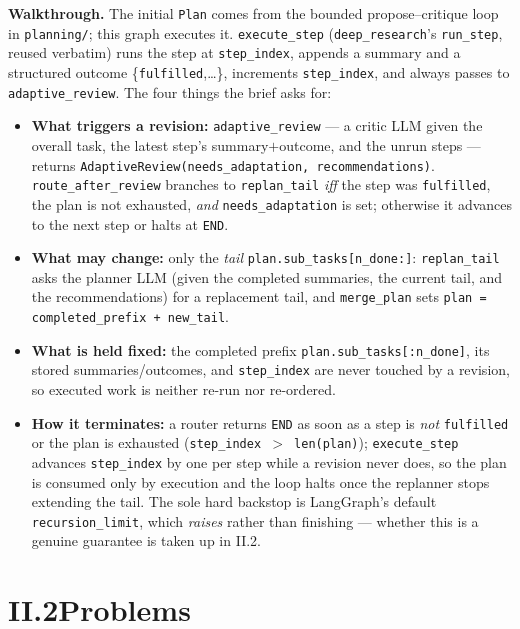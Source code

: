 \documentclass[11pt]{article}
\newcommand{\code}[1]{\texttt{#1}}
\begin{document}
\noindent\textbf{Walkthrough.} The initial \code{Plan} comes from the bounded propose--critique loop in \code{planning/}; this graph
executes it. \code{execute\_step} (\code{deep\_research}'s \code{run\_step}, reused verbatim) runs the step at \code{step\_index},
appends a summary and a structured outcome \{\code{fulfilled},\dots\}, increments \code{step\_index}, and always passes to
\code{adaptive\_review}. The four things the brief asks for:
\begin{itemize}[leftmargin=2.2em,label={},topsep=3pt,itemsep=4pt]
\item \textbf{What triggers a revision:} \code{adaptive\_review} --- a critic LLM given the overall task, the latest step's
summary$+$outcome, and the unrun steps --- returns \code{AdaptiveReview(needs\_adaptation, recommendations)}.
\code{route\_after\_review} branches to \code{replan\_tail} \emph{iff} the step was \code{fulfilled}, the plan is not exhausted,
\emph{and} \code{needs\_adaptation} is set; otherwise it advances to the next step or halts at \code{END}.
\item \textbf{What may change:} only the \emph{tail} \code{plan.sub\_tasks[n\_done:]}: \code{replan\_tail} asks the planner LLM (given the
completed summaries, the current tail, and the recommendations) for a replacement tail, and \code{merge\_plan} sets
\code{plan = completed\_prefix + new\_tail}.
\item \textbf{What is held fixed:} the completed prefix \code{plan.sub\_tasks[:n\_done]}, its stored summaries/outcomes, and
\code{step\_index} are never touched by a revision, so executed work is neither re-run nor re-ordered.
\item \textbf{How it terminates:} a router returns \code{END} as soon as a step is \emph{not} \code{fulfilled} or the plan is exhausted
(\code{step\_index $>$ len(plan)}); \code{execute\_step} advances \code{step\_index} by one per step while a revision never does, so
the plan is consumed only by execution and the loop halts once the replanner stops extending the tail. The sole hard backstop is
LangGraph's default \code{recursion\_limit}, which \emph{raises} rather than finishing --- whether this is a genuine guarantee is
taken up in II.2.
\end{itemize}

\section*{II.2\quad Problems}
\end{document}
